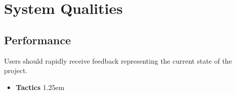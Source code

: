 \documentclass{article}
\newcommand{\indentsize}{1.25em}
\newcommand{\pbodyitem}[2]{
    \item \textbf{{#1}} {
    \parindent \indentsize \newline {#2}
}
}
\begin{document}
\section{System Qualities}{
  \label{sec:qualityattributes}
  \subsection{Performance}
  Users should rapidly receive feedback representing the current state of the project.
  \begin{itemize}
    \pbodyitem{Tactics}{



}
\end{itemize}}
\end{document}
